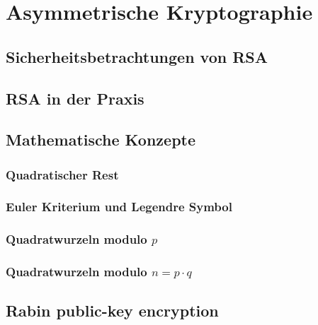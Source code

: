 \chapter{Asymmetrische Kryptographie}

\section{Sicherheitsbetrachtungen von RSA}


\section{RSA in der Praxis}

\section{Mathematische Konzepte}

\subsection{Quadratischer Rest}

\subsection{Euler Kriterium und Legendre Symbol}

\subsection{Quadratwurzeln modulo $p$}

\subsection{Quadratwurzeln modulo $n = p \cdot q$}

\section{Rabin public-key encryption}
